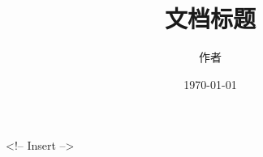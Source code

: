 \documentclass[UTF8, a4paper, 12pt]{ctexart}
\title{文档标题}
\author{作者}
\date{\today}
\begin{document}
\maketitle

<!-- Insert -->



\printindex
\end{document}
